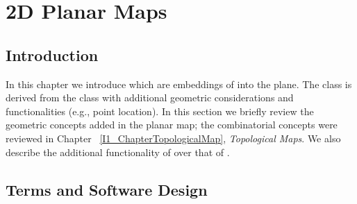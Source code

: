 
\def\Ipe#1{\def\IPEfile{#1}}

\renewcommand{\Re}{{\rm I\!\hspace{-0.025em} R}}

\def\C{{\cal C}}
\def\G{{\cal G}}
\def\F{{\cal F}}
\def\I{{\cal I}}
\def\U{{\cal U}}
\def\M{{\cal M}}
\def\eps{{\varepsilon}}
\def\bd{{\partial}}
\def\dm{{\cal D}}

\chapter{2D Planar Maps}
\label{I1_ChapterPlanarMap}
\minitoc

\section{Introduction}
\label{PM_sec:intro}

In this chapter we introduce  which are 
embeddings of  into the plane.
The  class is derived
from the  class with additional geometric
considerations and functionalities (e.g., point location). 
In this section we briefly review
the geometric concepts added in the planar map; the combinatorial concepts were
reviewed in Chapter ~\ref{I1_ChapterTopologicalMap}, {\em Topological Maps}.
We also describe the additional functionality of 
over that of .

\section{Terms and Software Design}

